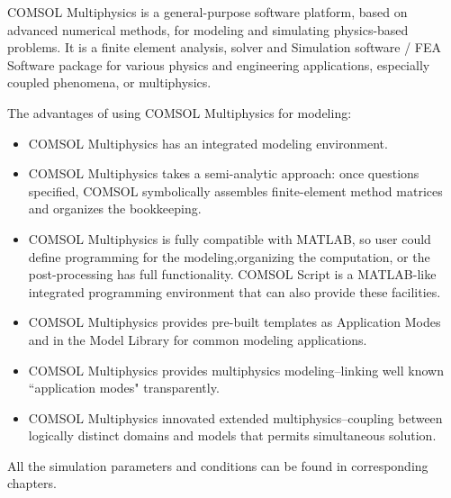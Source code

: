 COMSOL Multiphysics is a general-purpose software platform, based on advanced numerical methods, for modeling and simulating physics-based problems. It is a finite element analysis, solver and Simulation software / FEA Software package for various physics and engineering applications, especially coupled phenomena, or multiphysics.

The advantages of using COMSOL Multiphysics for modeling:
\begin{itemize}
	\item COMSOL Multiphysics has an integrated modeling environment.
	\item COMSOL Multiphysics takes a semi-analytic approach: once questions specified, COMSOL symbolically assembles finite-element method matrices and organizes the bookkeeping.
	\item COMSOL Multiphysics is fully compatible with MATLAB, so user could define programming for the modeling,organizing the computation, or the post-processing has full functionality. COMSOL Script is a MATLAB-like integrated programming environment that can also provide these facilities.
	\item COMSOL Multiphysics provides pre-built templates as Application Modes and in the Model Library for common modeling applications.
	\item COMSOL Multiphysics provides multiphysics modeling--linking well known ``application modes" transparently.
	\item COMSOL Multiphysics innovated extended multiphysics--coupling between logically distinct domains and models that permits simultaneous solution.
\end{itemize}

All the simulation parameters and conditions can be found in corresponding chapters.